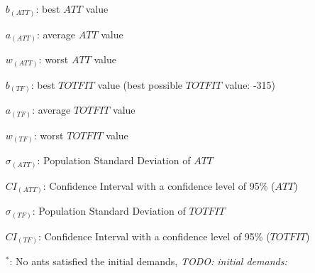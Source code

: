 \begin{sidewaystable}
\begin{itemize}[noitemsep]
    \item[$b_{(ATT)}$:] best $ATT$ value
    \item[$a_{(ATT)}$:] average $ATT$ value
    \item[$w_{(ATT)}$:] worst $ATT$ value
    \item[$b_{(TF)}$:] best $TOTFIT$ value (best possible $TOTFIT$ value: -315)
    \item[$a_{(TF)}$:] average $TOTFIT$ value
    \item[$w_{(TF)}$:] worst $TOTFIT$ value
    \item[$\sigma_{(ATT)}$:] Population Standard Deviation of $ATT$
    \item[$CI_{(ATT)}$:] Confidence Interval with a confidence level of 95\% ($ATT$)
    \item[$\sigma_{(TF)}$:] Population Standard Deviation of $TOTFIT$
    \item[$CI_{(TF)}$:] Confidence Interval with a confidence level of 95\% ($TOTFIT$)
    \item[$^*$:] No ants satisfied the initial demands, \emph{\color{blue} TODO: initial demands: }
    \end{itemize}
    \label{table:pm2}
\end{sidewaystable}



